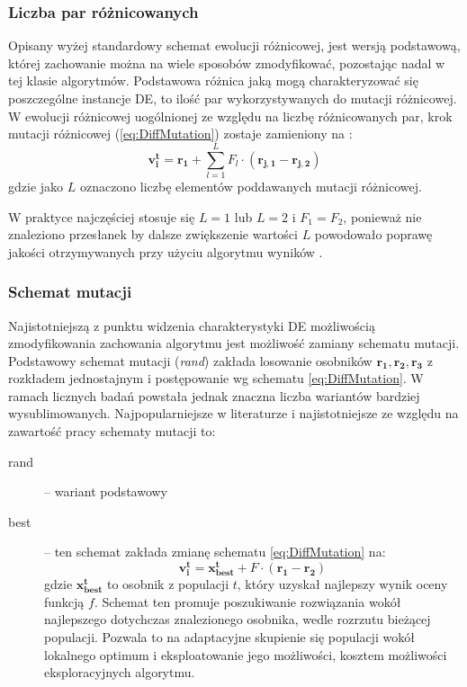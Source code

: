 \documentclass[12pt,a4paper]{report}
\begin{document}
{{\subsubsection{Liczba par różnicowanych}
\par{
Opisany wyżej standardowy schemat ewolucji różnicowej, jest wersją podstawową, której zachowanie można na wiele sposobów zmodyfikować, pozostając nadal w tej klasie algorytmów. Podstawowa różnica jaką mogą charakteryzować się poszczególne instancje DE, to ilość par wykorzystywanych do mutacji różnicowej. W ewolucji różnicowej uogólnionej ze względu na liczbę różnicowanych par, krok mutacji różnicowej (\ref{eq:DiffMutation}) zostaje zamieniony na \cite{PracticalInsights}:
\begin{equation}
\mathbf{v_i^{t}} = \mathbf{r_1} + \sum_{l = 1}^L F_l \cdot (\mathbf{r_{j,1}} - \mathbf{r_{j,2}})
\end{equation}
gdzie jako $L$ oznaczono liczbę elementów poddawanych mutacji różnicowej.
}
\par{
W praktyce najczęściej stosuje się $L = 1$ lub $L = 2$ i $F_1 = F_2$, ponieważ nie znaleziono przesłanek by dalsze zwiększenie wartości $L$ powodowało poprawę jakości otrzymywanych przy użyciu algorytmu wyników \cite{PracticalInsights}.
\subsubsection{Schemat mutacji}
\par{
Najistotniejszą z punktu widzenia charakterystyki DE możliwością zmodyfikowania zachowania algorytmu jest możliwość zamiany schematu mutacji. Podstawowy schemat mutacji (\emph{rand}) zakłada losowanie osobników $\mathbf{r_1}, \mathbf{r_2}, \mathbf{r_3}$ z rozkładem jednostajnym i postępowanie wg schematu \ref{eq:DiffMutation}. W ramach licznych badań powstała jednak znaczna liczba wariantów bardziej wysublimowanych. Najpopularniejsze w literaturze i najistotniejsze ze względu na zawartość pracy schematy mutacji to:
\begin{description}

\item[rand] \cite{RainerStorn,SpringerIntroToEvol} -- wariant podstawowy
\item[best] \cite{PracticalInsights} -- ten schemat zakłada zmianę schematu \ref{eq:DiffMutation} na:
\begin{equation}
\mathbf{v_i^{t}} = \mathbf{x_{best}^t} + F \cdot (\mathbf{r_{1}} - \mathbf{r_{2}})
\end{equation}
gdzie $\mathbf{x_{best}^t}$ to osobnik z populacji $t$, który uzyskał najlepszy wynik oceny funkcją $f$. Schemat ten promuje poszukiwanie rozwiązania wokół najlepszego dotychczas znalezionego osobnika, wedle rozrzutu bieżącej populacji. Pozwala to na adaptacyjne skupienie się populacji wokół lokalnego optimum i eksploatowanie jego możliwości, kosztem możliwości eksploracyjnych algorytmu.



\end{description}}}}}
\end{document}
